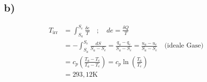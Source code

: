 

\subsection*{b)}
\begin{align*}
T_\text{irr} &= \int_{S_a}^{S_e} \frac{\delta e}{T} \quad ; \quad de = \frac{\delta Q}{T} \\
&= - \int_{S_a}^{S_e} \frac{dS}{S_a - S_e} = \frac{q_a - q_e}{S_a - S_e} = \frac{u_a - u_e}{S_a - S_e} \quad \text{(ideale Gase)} \\
&= c_p \left( \frac{T_a - T_e}{T_a - T_e} \right) = c_p \ln \left( \frac{T_a}{T_e} \right) \\
&= 293,12 \text{K}
\end{align*}